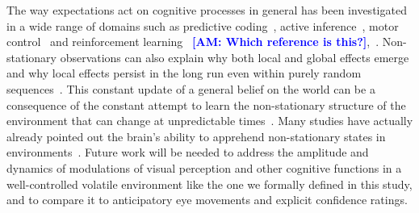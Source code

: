 \documentclass[12pt,english]{article}%
\newcommand{\citep}[1]{\parencite{#1}}
\newcommand{\AM}[1]{\textbf{\textcolor{blue}{[AM: #1]}}}
\begin{document}
The way expectations act on cognitive processes in general has been investigated in a wide range of domains such as predictive coding~\citep{Wacongne2012}, active inference~\citep{Friston2010}, motor control~\citep{WolpertGhahramani2000} and reinforcement learning~\citep{Sutton1998} \AM{Which reference is this?},~\citep{Behrens07,Wilson13}. Non-stationary observations can also explain why both local and global effects emerge and why local effects persist in the long run even within purely random sequences~\citep{Cho2002, Yu2009}. This constant update of a general belief on the world can be a consequence of the constant attempt to learn the non-stationary structure of the environment that can change at unpredictable times~\citep{Yu2009}. Many studies have actually already pointed out the brain's ability to apprehend non-stationary states in environments~\citep{Ossmy2013, Meyniel15}.
Future work will be needed to address the amplitude and dynamics of modulations of visual perception and other cognitive functions in a well-controlled volatile environment like the one we formally defined in this study, and to compare it to anticipatory eye movements and explicit confidence ratings.
\end{document}
